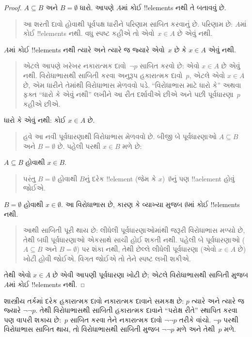 \documentclass[../../../include/open-logic-section]{subfiles}
\begin{document}
\begin{proof}
  $A \subseteq B$ અને $B = \emptyset$ ધારો. આપણે
  $A$માં કોઈ !!{element}s નથી તે બતાવવું છે.
  \begin{quote}
    આ શરતી દાવો હોવાથી પૂર્વપક્ષ ધારીને પરિણામ સાબિત
    કરવાનું છે. પરિણામ છે: $A$માં કોઈ !!{element}s નથી.
    વધુ સ્પષ્ટ કહીએ તો એવો~$x \in A$ છે એવું નથી.
  \end{quote}
  $A$માં કોઈ !!{element}s નથી ત્યારે અને ત્યારે જ જ્યારે
  એવો~$x$ છે કે $x \in A$ એવું નથી.
  \begin{quote}
    એટલે આપણે ખરેખર નકારાત્મક દાવો~$\lnot p$ સાબિત કરવો છે:
    એવો $x \in A$ છે એવું નથી. વિરોધાભાસથી સાબિતી કરવા
    અનુરૂપ હકારાત્મક દાવો~$p$, એટલે એવો $x \in A$ છે, એમ
    ધારીને તેમાંથી વિરોધાભાસ મેળવવો પડે. ``વિરોધાભાસ માટે
    ધારો કે'' અથવા ફક્ત ``ધારો કે એવું નથી'' લખીને આ રીત
    દર્શાવીએ છીએ અને પછી પૂર્વધારણા~$p$ કહીએ છીએ.
  \end{quote}
  ધારો કે એવું નથી: કોઈ $x \in A$ છે.
  \begin{quote}
    હવે આ નવી પૂર્વધારણાથી વિરોધાભાસ મેળવવો છે. બીજી બે
    પૂર્વધારણાઓ $A \subseteq B$ અને $B = \emptyset$ છે.
    પહેલી પરથી $x \in B$ મળે છે:
  \end{quote}
  $A \subseteq B$ હોવાથી $x \in B$.
  \begin{quote}
    પરંતુ $B = \emptyset$ હોવાથી $B$નું દરેક !!{element}
    (જેમ કે $x$)~$\emptyset$નું પણ !!a{element} હોવું જોઈએ.
  \end{quote}
  $B = \emptyset$ હોવાથી $x \in \emptyset$. આ વિરોધાભાસ છે,
  કારણ કે વ્યાખ્યા મુજબ $\emptyset$માં કોઈ !!{element}s નથી.
  \begin{quote}
    આથી સાબિતી પૂરી થાય છે: લીધેલી પૂર્વધારણાઓમાંથી જરૂરી
    વિરોધાભાસ મળ્યો છે, તેથી બધી પૂર્વધારણાઓ એકસાથે સાચી
    હોઈ શકતી નથી. પહેલી બે પૂર્વધારણાઓ ($A \subseteq B$ અને
    $B = \emptyset$) પર શંકા નથી, તેથી છેલ્લે લીધેલી
    પૂર્વધારણા (એવો $x \in A$ છે) ખોટી હોવી જોઈએ. વિગત
    જોઈએ તો તેને સ્પષ્ટ લખી શકીએ.
  \end{quote}
  તેથી એવો $x \in A$ છે એવી આપણી પૂર્વધારણા ખોટી છે;
  એટલે વિરોધાભાસથી સાબિતી મુજબ $A$માં કોઈ !!{element}s નથી.
\end{proof}

શાસ્ત્રીય તર્કમાં દરેક હકારાત્મક દાવો નકારાત્મક દાવાને સમકક્ષ
છે: $p$ ત્યારે અને ત્યારે જ જ્યારે $\lnot\lnot p$.
 તેથી વિરોધાભાસથી સાબિતી હકારાત્મક
દાવાને ``પરોક્ષ રીતે'' સ્થાપિત કરવા પણ વાપરી શકાય છે:~$p$
સાબિત કરવા તેને નકારાત્મક દાવો $\lnot\lnot p$ તરીકે વાંચો.
$\lnot p$ પરથી વિરોધાભાસ સાબિત થાય, તો વિરોધાભાસથી સાબિતી
મુજબ $\lnot\lnot p$ મળે અને તેથી~$p$ મળે.
\end{document}

